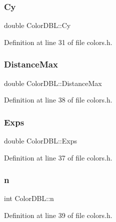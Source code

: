 \subsubsection{\texorpdfstring{Cy}{Cy}}
{\footnotesize\ttfamily double Color\+D\+B\+L\+::\+Cy}



Definition at line 31 of file colors.\+h.

\mbox{\label{struct_color_d_b_l_a0dd11fac7a3243fae5357a010549c79b}} 
\subsubsection{\texorpdfstring{Distance\+Max}{DistanceMax}}
{\footnotesize\ttfamily double Color\+D\+B\+L\+::\+Distance\+Max}



Definition at line 38 of file colors.\+h.

\mbox{\label{struct_color_d_b_l_ae15fca56fd7556c23cbe7c527989d4fb}} 
\subsubsection{\texorpdfstring{Exps}{Exps}}
{\footnotesize\ttfamily double Color\+D\+B\+L\+::\+Exps}



Definition at line 37 of file colors.\+h.

\mbox{\label{struct_color_d_b_l_a386d58a5189f753a7f74e3d7f250cf29}} 
\subsubsection{\texorpdfstring{n}{n}}
{\footnotesize\ttfamily int Color\+D\+B\+L\+::n}



Definition at line 39 of file colors.\+h.

\mbox{\label{struct_color_d_b_l_a69a19813a90cb1464e4bc5ab26572e7d}} 
